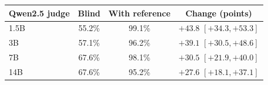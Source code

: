 \begin{tabular}{lccc}
\toprule
Qwen2.5 judge & Blind & With reference & Change (points) \\
\midrule
1.5B & 55.2\% & 99.1\% & $+43.8$ {\scriptsize$[+34.3,+53.3]$} \\
3B & 57.1\% & 96.2\% & $+39.1$ {\scriptsize$[+30.5,+48.6]$} \\
7B & 67.6\% & 98.1\% & $+30.5$ {\scriptsize$[+21.9,+40.0]$} \\
14B & 67.6\% & 95.2\% & $+27.6$ {\scriptsize$[+18.1,+37.1]$} \\
\bottomrule
\end{tabular}
